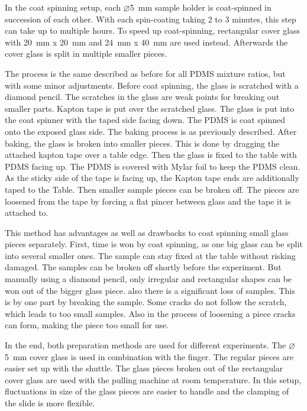 In the coat spinning setup, each  $\varnothing$\SI{5}{\milli\meter} sample holder is coat-spinned in succession of each other. With each spin-coating taking 2 to 3 minutes, this step can take up to multiple hours. To speed up coat-spinning, rectangular cover glass with \SI{20}{\milli\meter} x \SI{20}{\milli\meter} and \SI{24}{\milli\meter} x \SI{40}{\milli\meter} are used instead. Afterwards the cover glass is split in multiple smaller pieces. 

The process is the same described as before for all PDMS mixture ratios, but with some minor adjustments. Before coat spinning, the glass is scratched with a diamond pencil. The scratches in the glass are weak points for breaking out smaller parts. Kapton tape is put over the scratched glass. The glass is put into the coat spinner with the taped side facing down. The PDMS is coat spinned onto the exposed glass side. The baking process is as previously described. After baking, the glass is broken into smaller pieces. This is done by dragging the attached kapton tape over a table edge. Then the glass is fixed to the table with PDMS facing up. The PDMS is covered with Mylar foil to keep the PDMS clean. As the sticky side of the tape is facing up, the Kapton tape ends are additionally taped to the Table. Then smaller sample pieces can be broken off. The pieces are loosened from the tape by forcing a flat pincer between glass and the tape it is attached to.

This method has advantages as well as drawbacks to coat spinning small glass pieces separately. First, time is won by coat spinning, as one big glass can be split into several smaller ones. The sample can stay fixed at the table without risking damaged. The samples can be broken off shortly before the experiment. But manually using a diamond pencil, only irregular and rectangular shapes can be won out of the bigger glass piece. also there is a significant loss of samples. This is by one part by breaking the sample. Some cracks do not follow the scratch, which leads to too small samples. Also in the process of loosening a piece cracks can form, making the piece too small for use.

In the end, both preparation methods are used for different experiments. The $\varnothing$\SI{5}{\milli\meter} cover glass is used in combination with the finger. The regular pieces are easier set up with the shuttle. The glass pieces broken out of the rectangular cover glass are used with the pulling machine at room temperature. In this setup, fluctuations in size of the glass pieces are easier to handle and the clamping of the slide is more flexible.

